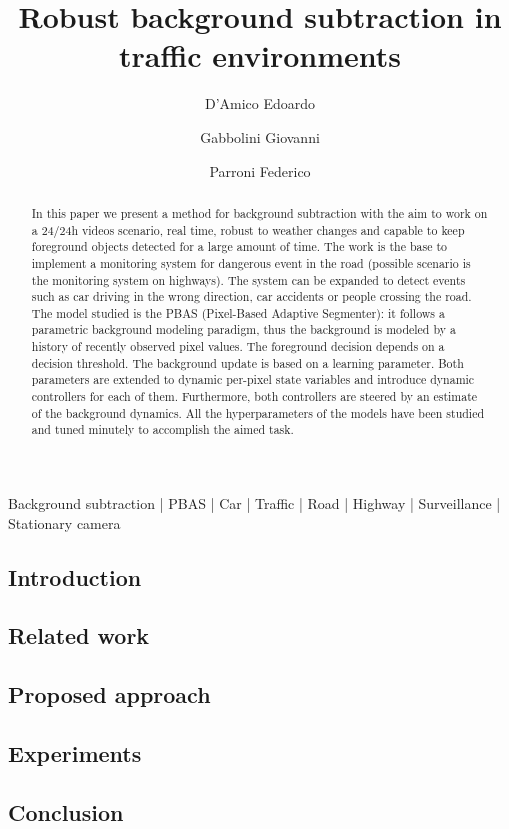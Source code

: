 
\title{Robust background subtraction in traffic environments}

\author[1 \space *]{D'Amico Edoardo}
\author[1 \space *]{Gabbolini Giovanni}
\author[1 \space *]{Parroni Federico}


\maketitle

\begin{abstract}
In this paper we present a method for background subtraction with the aim to work on a 24/24h videos scenario, real time, robust to weather changes and capable to keep foreground objects detected for a large amount of time. The work is the base to implement a monitoring system for dangerous event in the road (possible scenario is the monitoring system on highways). The system can be expanded to detect events such as car driving in the wrong direction, car accidents or people crossing the road.
The model studied is the PBAS (Pixel-Based Adaptive Segmenter): it follows a parametric background modeling paradigm, thus the background is modeled by a history of recently observed pixel
values. The foreground decision depends on a decision
threshold. The background update is based on a learning parameter. Both parameters are extended to dynamic per-pixel state variables and introduce dynamic controllers for each of them. Furthermore, both controllers are steered by an estimate of the background dynamics.
All the hyperparameters of the models have been studied and tuned minutely to accomplish the aimed task.
\end {abstract}

\begin{keywords}
    Background subtraction | PBAS | Car | Traffic | Road | Highway | Surveillance | Stationary camera
\end{keywords}


\subsection*{Introduction}


\subsection*{Related work}


\subsection*{Proposed approach}


\subsection*{Experiments}


\subsection*{Conclusion}

